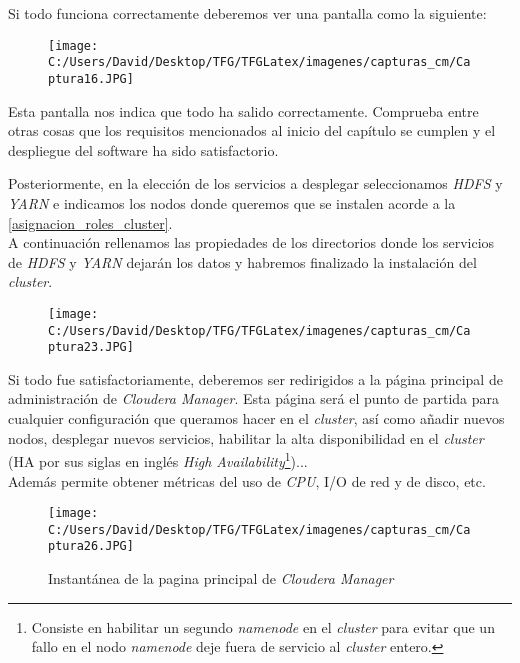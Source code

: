 Si todo funciona correctamente deberemos ver una pantalla como la siguiente:

\begin{figure}[!htpb]
  \centering
  \texttt{[image: C:/Users/David/Desktop/TFG/TFGLatex/imagenes/capturas\_cm/Captura16.JPG]}
\end{figure}

Esta pantalla nos indica que todo ha salido correctamente. Comprueba entre otras cosas que los requisitos
mencionados al inicio del capítulo se cumplen y el despliegue del software ha sido satisfactorio.
\newline

Posteriormente, en la elección de los servicios a desplegar seleccionamos \textit{HDFS} y \textit{YARN} e
indicamos los nodos donde queremos que se instalen acorde a la \autoref{asignacion_roles_cluster}.\\
A continuación rellenamos las propiedades de los directorios donde los servicios de \textit{HDFS} y \textit{YARN}
dejarán los datos y habremos finalizado la instalación del \textit{cluster}.

\begin{figure}[!htpb]
  \centering
  \texttt{[image: C:/Users/David/Desktop/TFG/TFGLatex/imagenes/capturas\_cm/Captura23.JPG]}
\end{figure}

Si todo fue satisfactoriamente, deberemos ser redirigidos a la página principal de administración de
\textit{Cloudera Manager}. Esta página será el punto de partida para cualquier configuración que queramos hacer
en el \textit{cluster}, así como añadir nuevos nodos, desplegar nuevos servicios, habilitar la alta
disponibilidad en el \textit{cluster} (HA por sus siglas en inglés 
\textit{High Availability}\footnote{Consiste en habilitar un segundo \textit{namenode} en el \textit{cluster} 
para evitar que un fallo en el nodo \textit{namenode} deje fuera de servicio al \textit{cluster} entero.})...\\
Además permite obtener métricas del uso de \textit{CPU}, I/O de red y de disco, etc.

\begin{figure}[!htpb]
  \centering
  \texttt{[image: C:/Users/David/Desktop/TFG/TFGLatex/imagenes/capturas\_cm/Captura26.JPG]}
  \caption[Instantánea \textit{Cloudera Manager}]{Instantánea de la pagina principal de \textit{Cloudera Manager}}
\end{figure}

